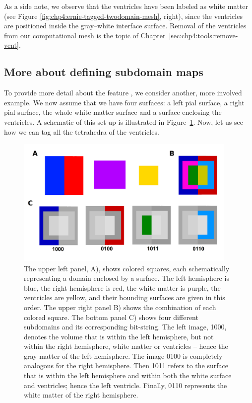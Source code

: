 As a side note, we observe that the ventricles have been labeled as
white matter (see Figure \ref{fig:chp4:ernie-tagged-twodomain-mesh},
right), since the ventricles are positioned inside the gray--white
interface surface. Removal of the ventricles from our computational mesh
is the topic of Chapter~\ref{sec:chp4:tools:remove-vent}.

\subsection{More about defining \svmtk{} subdomain maps}  
\label{chp4:subdomains}
To provide more detail about the \svmtk{} feature
, we consider another, more involved
example. We now assume that we have four surfaces: a left pial
surface, a right pial surface, the whole white matter surface and a
surface enclosing the ventricles. A schematic of this set-up is
illustrated in Figure~\ref{fig:chp4:smap-example}. Now, let us see how
we can tag all the tetrahedra of the ventricles.
\begin{figure}[t]
  \includegraphics[width=0.95\textwidth]{./graphics/chp4/dot.png}
  \caption{The upper left panel, A), shows colored squares, each
    schematically representing a domain enclosed by a surface. The
    left hemisphere is blue, the right hemisphere is red, the white
    matter is purple, the ventricles are yellow, and their bounding
    surfaces are given in this order. The upper right panel B) shows the
    combination of each colored square. The bottom panel C) shows four
    different subdomains and its corresponding bit-string. The left
    image, 1000, denotes the volume that is within the left
    hemisphere, but not within the right hemisphere, white matter or
    ventricles -- hence the gray matter of the left hemisphere. The
    image 0100 is completely analogous for the right hemisphere. Then
    1011 refers to the surface that is within the left hemisphere
    and within both the white surface and ventricles; hence the left
    ventricle. Finally, 0110 represents the white matter of the
    right hemisphere. }
\label{fig:chp4:smap-example}
\end{figure}

